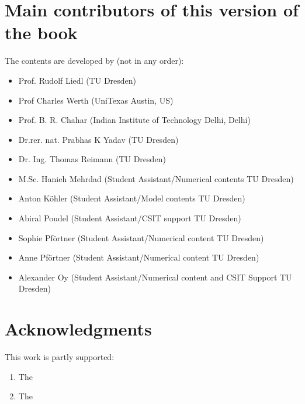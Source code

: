 \documentclass[letterpaper,10pt,english]{sphinxmanual}
\begin{document}
\chapter{Main contributors of this version of the book}
\label{\detokenize{intro:main-contributors-of-this-version-of-the-book}}
The contents are developed by (not in any order):
\begin{itemize}
\item {} 
Prof. Rudolf Liedl (TU Dresden)

\item {} 
Prof Charles Werth (Uni\sphinxhyphen{}Texas Austin, US)

\item {} 
Prof. B. R. Chahar (Indian Institute of Technology Delhi, Delhi)

\item {} 
Dr.rer. nat. Prabhas K Yadav (TU Dresden)

\item {} 
Dr. Ing. Thomas Reimann (TU Dresden)

\item {} 
M.Sc. Hanieh Mehrdad (Student Assistant/Numerical contents\sphinxhyphen{} TU Dresden)

\item {} 
Anton Köhler (Student Assistant/Model contents \sphinxhyphen{} TU Dresden)

\item {} 
Abiral Poudel (Student Assistant/CS\sphinxhyphen{}IT support  \sphinxhyphen{} TU Dresden)

\item {} 
Sophie Pförtner (Student Assistant/Numerical content \sphinxhyphen{} TU Dresden)

\item {} 
Anne  Pförtner (Student Assistant/Numerical content \sphinxhyphen{} TU Dresden)

\item {} 
Alexander Oy (Student Assistant/Numerical content and CS\sphinxhyphen{}IT Support \sphinxhyphen{} TU Dresden)

\end{itemize}


\chapter{Acknowledgments}
\label{\detokenize{intro:acknowledgments}}
This work is partly supported:
\begin{enumerate}
%
\item {} 
The 

\item {} 
The 

\end{enumerate}
\end{document}

